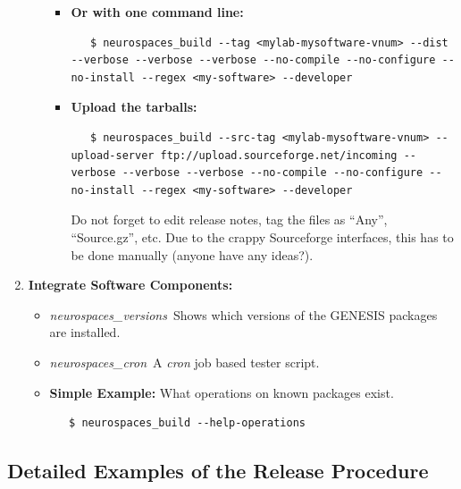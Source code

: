 \documentclass[12pt]{article}
\begin{document}
\begin{enumerate}
\begin{itemize}
\begin{itemize}
         \item {\bf Or with one command line:}
\begin{verbatim}
   $ neurospaces_build --tag <mylab-mysoftware-vnum> --dist --verbose --verbose --verbose --no-compile --no-configure --no-install --regex <my-software> --developer
\end{verbatim}

         \item {\bf Upload the tarballs:}
\begin{verbatim}
   $ neurospaces_build --src-tag <mylab-mysoftware-vnum> --upload-server ftp://upload.sourceforge.net/incoming --verbose --verbose --verbose --no-compile --no-configure --no-install --regex <my-software> --developer
\end{verbatim}
Do not forget to edit release notes, tag the files as ``Any'', ``Source.gz'', etc. Due to the crappy Sourceforge interfaces, this has to be done manually (anyone have any ideas?).
      
   \end{itemize}
\end{itemize}
  
   \item {\bf Integrate Software Components:}
   \begin{itemize}
      \item {\it neurospaces\_versions}\,\,\,Shows which versions of the GENESIS packages are installed.
      \item {\it neurospaces\_cron}\,\,\,A {\it cron} job based tester script. 
      \item {\bf Simple Example:} What operations on known packages exist.
      \begin{verbatim}
   $ neurospaces_build --help-operations
      \end{verbatim}
   \end{itemize}

\end{enumerate}

\subsection*{Detailed Examples of the Release Procedure}
\end{document}
